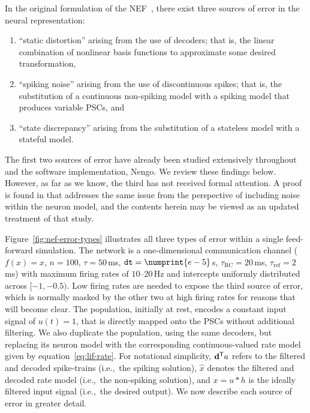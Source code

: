 In the original formulation of the NEF~\citep{eliasmith2003a}, there exist three sources of error in the neural representation:
\begin{enumerate}
\item ``static distortion'' arising from the use of decoders; that is, the linear combination of nonlinear basis functions to approximate some desired transformation,
\item ``spiking noise'' arising from the use of discontinuous spikes; that is, the substitution of a continuous non-spiking model with a spiking model that produces variable PSCs, and
\item ``state discrepancy'' arising from the substitution of a stateless model with a stateful model.
\end{enumerate}
The first two sources of error have already been studied extensively throughout \citet{eliasmith2003a} and the software implementation, Nengo.
We review these findings below.
However, as far as we know, the third has not received formal attention.
A proof is found in \citet[][pp.~132--136, appendix~C.1]{eliasmith2003a} that addresses the same issue from the perspective of including noise within the neuron model, and the contents herein may be viewed as an updated treatment of that study.

Figure~\ref{fig:nef-error-types} illustrates all three types of error within a single feed-forward simulation.
The network is a one-dimensional communication channel ($f(x) = x$, $n = 100$, $\tau = 50$\,ms, $\dt{} = \numprint{e-5}$\,s, $\tau_\text{RC} = 20$\,ms, $\tau_\text{ref} = 2$\,ms) with maximum firing rates of $10$--$20$\,Hz and intercepts uniformly distributed across $[-1, -0.5)$.
Low firing rates are needed to expose the third source of error, which is normally masked by the other two at high firing rates for reasons that will become clear.
The population, initially at rest, encodes a constant input signal of $u(t) = 1$, that is directly mapped onto the PSCs without additional filtering.
We also duplicate the population, using the same decoders, but replacing its neuron model with the corresponding continuous-valued rate model given by equation~\ref{eq:lif-rate}.
For notational simplicity, ${\mathbf{d}}^\mathsf{T}a$ refers to the filtered and decoded spike-trains (i.e.,~the spiking solution), $\hat{x}$ denotes the filtered and decoded rate model (i.e.,~the non-spiking solution), and $x = u \ast h$ is the ideally filtered input signal (i.e.,~the desired output).
We now describe each source of error in greater detail.

